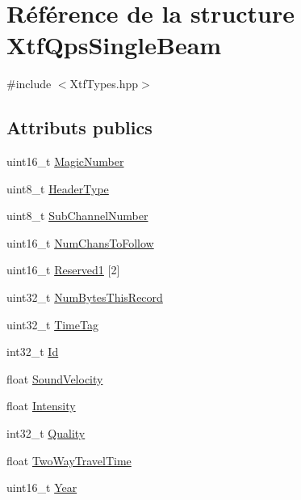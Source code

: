 \hypertarget{structXtfQpsSingleBeam}{}\section{Référence de la structure Xtf\+Qps\+Single\+Beam}
\label{structXtfQpsSingleBeam}


{\ttfamily \#include $<$Xtf\+Types.\+hpp$>$}

\subsection*{Attributs publics}
\begin{DoxyCompactItemize}
\item 
uint16\+\_\+t \hyperlink{structXtfQpsSingleBeam_acb7ffaeeaf22d2379b054d9d25ca18f2}{Magic\+Number}
\item 
uint8\+\_\+t \hyperlink{structXtfQpsSingleBeam_a029a5abb8e60511708890df28ae3967c}{Header\+Type}
\item 
uint8\+\_\+t \hyperlink{structXtfQpsSingleBeam_ae3dd7caca3c496604bc34263608fe97a}{Sub\+Channel\+Number}
\item 
uint16\+\_\+t \hyperlink{structXtfQpsSingleBeam_a2ce3e79aaf81928392dda2bb901937c0}{Num\+Chans\+To\+Follow}
\item 
uint16\+\_\+t \hyperlink{structXtfQpsSingleBeam_a06cfe720d0dd006680ac113fb8a5aa50}{Reserved1} \mbox{[}2\mbox{]}
\item 
uint32\+\_\+t \hyperlink{structXtfQpsSingleBeam_aa2df8455373465eec7e69b7d7afba2d3}{Num\+Bytes\+This\+Record}
\item 
uint32\+\_\+t \hyperlink{structXtfQpsSingleBeam_a6a55ebf7aceb0e1b1d91af0a7675dcf9}{Time\+Tag}
\item 
int32\+\_\+t \hyperlink{structXtfQpsSingleBeam_a87cbb7271d4169b2b3214035177423a1}{Id}
\item 
float \hyperlink{structXtfQpsSingleBeam_a64d35863aaca9f393bde36aa4412d0cc}{Sound\+Velocity}
\item 
float \hyperlink{structXtfQpsSingleBeam_adfc349caa053b11f53f2b1f513629aba}{Intensity}
\item 
int32\+\_\+t \hyperlink{structXtfQpsSingleBeam_a48d0f24e740910ab98f0ef153ada7a90}{Quality}
\item 
float \hyperlink{structXtfQpsSingleBeam_a45e1375529eef8d1e4efb1cfcff79477}{Two\+Way\+Travel\+Time}
\item 
uint16\+\_\+t \hyperlink{structXtfQpsSingleBeam_a11d6f784f7b6bbdd1af156a312a48256}{Year}

\end{DoxyCompactItemize}
